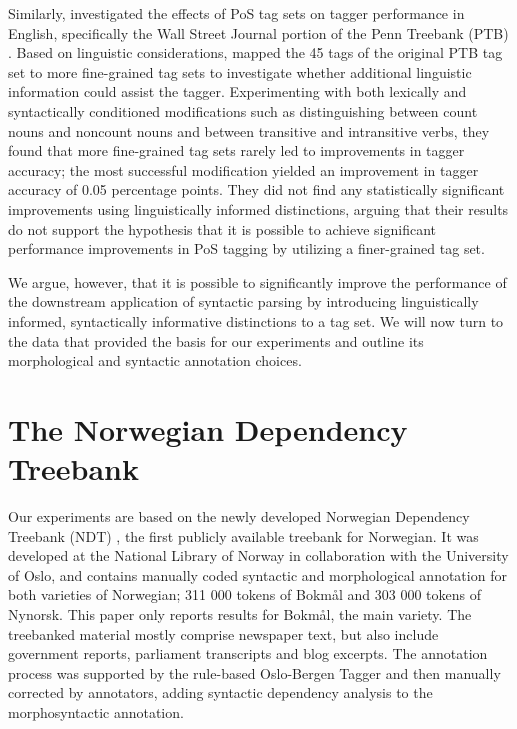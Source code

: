 \documentclass[11pt,a4paper]{article}
\begin{document}
Similarly,  investigated the effects of PoS tag sets on tagger
performance in English, specifically the Wall Street Journal portion of the
Penn Treebank (PTB) \cite{Mar:San:Mar:93}. Based on linguistic considerations,
 mapped the 45 tags of the original PTB tag set to more
fine-grained tag sets to investigate whether additional linguistic information
could assist the tagger. Experimenting with both lexically and syntactically
conditioned modifications such as distinguishing between count nouns and
noncount nouns and between transitive and intransitive verbs, they found that
more fine-grained tag sets rarely led to improvements in tagger accuracy; the
most successful modification yielded an improvement in tagger accuracy of 0.05
percentage points. They did not find any statistically significant
improvements using linguistically informed distinctions, arguing that their
results do not support the hypothesis that it is possible to achieve
significant performance improvements in PoS tagging by utilizing a
finer-grained tag set.

We argue, however, that it is possible to significantly improve the performance
of the downstream application of syntactic parsing by introducing
linguistically informed, syntactically informative distinctions to a tag set.
We will now turn to the data that provided the basis for our experiments and
outline its morphological and syntactic annotation choices.

\section{The Norwegian Dependency Treebank}
\label{sec:data}
Our experiments are based on the newly developed Norwegian Dependency Treebank
(NDT) \cite{Sol:Skj:Ovr:14}, the first publicly available treebank for
Norwegian. It was developed at the National Library of Norway in collaboration
with the University of Oslo, and contains manually coded syntactic and
morphological annotation for both varieties of Norwegian; 311 000 tokens of
Bokmål and 303 000 tokens of Nynorsk. This paper only reports results for
Bokmål, the main variety. The treebanked material mostly comprise newspaper
text, but also include government reports, parliament transcripts and blog
excerpts. The annotation process was supported by the rule-based Oslo-Bergen
Tagger \cite{Hag:Joh:Nok:00} and then manually corrected by annotators, adding
syntactic dependency analysis to the morphosyntactic annotation.
\end{document}
